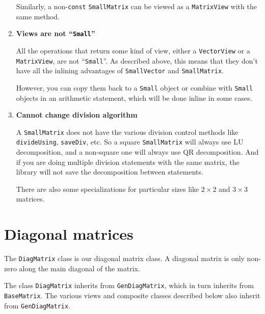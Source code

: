 \documentclass[twoside,letterpaper,11pt]{article}
\renewcommand{\tt}[1]{{\lstinline {#1}}}
\begin{document}
\begin{enumerate}
Similarly, a non-\tt{const} \tt{SmallMatrix} can be viewed as a \tt{MatrixView}
with the same method.

\item
\textbf{Views are not ``\tt{Small}''}

All the operations that return some kind of view,
either a \tt{VectorView} or a \tt{MatrixView}, are not ``\tt{Small}''.
As described above, this means that they don't have all the inlining advantages of 
\tt{SmallVector} and \tt{SmallMatrix}.  

However, you can copy them back to a \tt{Small} object or combine
with \tt{Small} objects in an arithmetic statement, which will be done inline
in some cases.

\item
\textbf{Cannot change division algorithm}

A \tt{SmallMatrix} does not have the various division control methods 
like \tt{divideUsing}, \tt{saveDiv}, etc.
So a square \tt{SmallMatrix} will always use
LU decomposition, and a non-square one will always use QR decomposition.
And if you are doing multiple division statements with the same matrix,
the library will not save the decomposition between statements.  

There are also some specializations for particular sizes like $2 \times 2$ and $3 \times 3$
matrices.

\end{enumerate}

\newpage
\section{Diagonal matrices}
\label{DiagMatrix}

The \tt{DiagMatrix} class is our diagonal matrix class.  
A diagonal matrix is only non-zero
along the main diagonal of the matrix.  

The class \tt{DiagMatrix} inherits from \tt{GenDiagMatrix},
which in turn inherits from \tt{BaseMatrix}.
The various views and composite classes described below
also inherit from \tt{GenDiagMatrix}.
\end{document}
